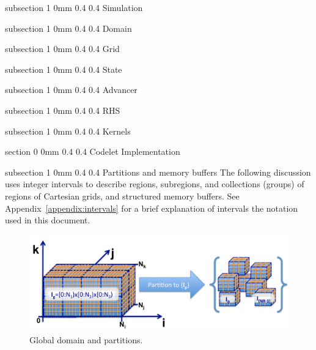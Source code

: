 \documentclass[11pt]{article}
\makeatletter
\renewcommand{\section}{\@startsection
{section}%
{0}%
{0mm}%
{0.4\baselineskip}%
{0.4\baselineskip}%
{\normalfont\Large\bfseries\color{myBrown}}}%
\renewcommand{\subsection}{\@startsection
{subsection}%
{1}%
{0mm}%
{0.4\baselineskip}%
{0.4\baselineskip}%
{\normalfont\large\bfseries\color{myBrown}}}%
\makeatother
\begin{document}
\subsection{Simulation}

\subsection{Domain}

\subsection{Grid}

\subsection{State}

\subsection{Advancer}

\subsection{RHS}

\subsection{Kernels}

\section{Codelet Implementation}

\subsection{Partitions and memory buffers}
The following discussion uses integer intervals to describe regions, subregions, and collections (groups) of regions of Cartesian grids, and structured memory buffers. See Appendix~\ref{appendix:intervals} for a brief explanation of intervals the notation used in this document. 

\begin{figure}[h]
\begin{center}
\includegraphics[width=\textwidth]{Figures/Partitions}
\vspace{-20pt}
\caption{Global domain and partitions.}\label{fig:Partitions}
\end{center}
\end{figure}
\end{document}
